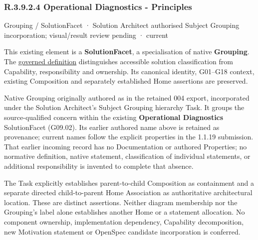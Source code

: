 \subsubsection*{R.3.9.2.4 Operational Diagnostics - Principles}
\label{navigation:R.3.9.2.4}

\label{element:1eb3b965c7334b899133282bc0500a9d}
{\small Grouping / SolutionFacet · Solution Architect authorised Subject Grouping incorporation; visual/result review pending · current}\par

This existing element is a \textbf{SolutionFacet}, a specialisation of native
\textbf{Grouping}. The \href{\detokenize{../../../../../../../governance/continuum-representation.md#solutionfacet-classification--1119-candidate}}{governed definition}
distinguishes accessible solution classification from Capability, responsibility
and ownership. Its canonical identity, G01–G18 context, existing Composition
and separately established Home assertions are preserved.



Native Grouping originally authored as \texttt{} in the retained 004 export,
incorporated under the Solution Architect's Subject Grouping hierarchy Task.
It groups the source-qualified \texttt{} concern within
the existing \textbf{Operational Diagnostics} SolutionFacet (G09.02). Its earlier authored name above is retained as provenance; current names
follow the explicit properties in the 1.1.19 submission.
That earlier incoming record has no Documentation or authored Properties; no normative
definition, native statement, classification of individual statements, or
additional responsibility is invented to complete that absence.



The Task explicitly establishes parent-to-child Composition as containment and
a separate directed child-to-parent Home Association as authoritative architectural
location. These are distinct assertions. Neither diagram membership nor the
Grouping's label alone establishes another Home or a statement allocation.
No component ownership, implementation dependency, Capability decomposition,
new Motivation statement or OpenSpec candidate incorporation is conferred.



